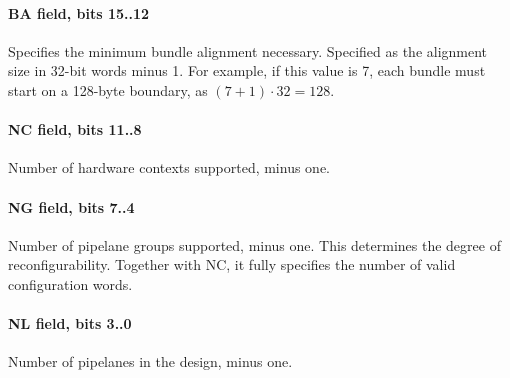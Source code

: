 \paragraph*{BA field, bits 15..12}
Specifies the minimum bundle alignment necessary. Specified as the alignment
size in 32-bit words minus 1. For example, if this value is 7, each bundle must
start on a 128-byte boundary, as $(7 + 1) \cdot 32 = 128$.
\paragraph*{NC field, bits 11..8}
Number of hardware contexts supported, minus one.
\paragraph*{NG field, bits 7..4}
Number of pipelane groups supported, minus one. This determines the degree of
reconfigurability. Together with NC, it fully specifies the number of valid
configuration words.
\paragraph*{NL field, bits 3..0}
Number of pipelanes in the design, minus one.
